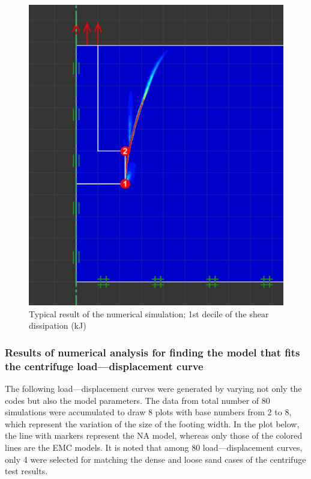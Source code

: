 \documentclass[a4paper, nobind]{templates/ociamthesis}
\begin{document}
\begin{figure}[H]
\includegraphics[width=1\linewidth]{myfigureeeeee/typicalresult} \caption{Typical result of the numerical simulation; 1st decile of the shear dissipation (kJ)}\label{fig:unnamed-chunk-37}
\end{figure}

\hypertarget{results-of-numerical-analysis-for-finding-the-model-that-fits-the-centrifuge-loaddisplacement-curve}{%
\subsubsection{Results of numerical analysis for finding the model that fits the centrifuge load---displacement curve}\label{results-of-numerical-analysis-for-finding-the-model-that-fits-the-centrifuge-loaddisplacement-curve}}

The following load---displacement curves were generated by varying not only the codes but also the model parameters. The data from total number of 80 simulations were accumulated to draw 8 plots with base numbers from 2 to 8, which represent the variation of the size of the footing width. In the plot below, the line with markers represent the NA model, whereas only those of the colored lines are the EMC models. It is noted that among 80 load---displacement curves, only 4 were selected for matching the dense and loose sand cases of the centrifuge test results.
\end{document}
